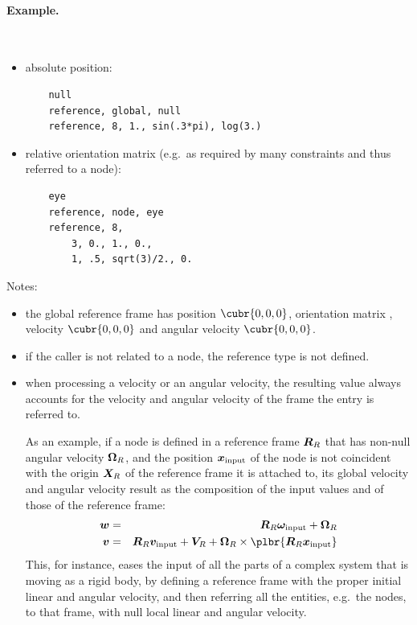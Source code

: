 \paragraph{Example.} \
\begin{itemize}
    \item absolute position:
    \begin{verbatim}
    null
    reference, global, null
    reference, 8, 1., sin(.3*pi), log(3.)
    \end{verbatim}
    \item relative orientation matrix (e.g.\ as required by many constraints and
    thus referred to a node):
    \begin{verbatim}
    eye
    reference, node, eye
    reference, 8,
        3, 0., 1., 0., 
        1, .5, sqrt(3)/2., 0.
    \end{verbatim}
\end{itemize}
Notes: 
\begin{itemize}
    \item the global reference frame has position $ \cubr{0, 0, 0} $,
    orientation matrix \kw{eye}, velocity $ \cubr{0, 0, 0} $ and angular
    velocity $ \cubr{0, 0, 0} $.
    \item if the caller is not related to a node, the reference type
    \kw{node} is not defined. 
    \item when processing a velocity or an angular velocity, the resulting
    value always accounts for the velocity and angular velocity of the frame
    the entry is referred to. 

    As an example, if a node is defined in a reference frame $\boldsymbol{R}_R$
    that has non-null angular velocity $ \boldsymbol{\Omega}_R $, and the position 
    $ \boldsymbol{x}_{\text{input}} $ of the node is not coincident
    with the origin $ \boldsymbol{X}_R $ of the reference frame
    it is attached to, its global velocity and angular velocity result
    as the composition of the input values and of those of the reference 
    frame:
    \begin{eqnarray*}    
        \T{w} & = & \T{R}_R \T{\omega}_{\text{input}} + \T{\Omega}_R \\
	\T{v} & = & \T{R}_R \T{v}_{\text{input}} + \T{V}_R
		+\T{\Omega}_R\times\plbr{\T{R}_R \T{x}_{\text{input}}}
    \end{eqnarray*}
    This, for instance, eases the input of all the parts of a complex system
    that is moving as a rigid body, by defining a reference frame with the
    proper initial linear and angular velocity, and then referring all the entities, e.g.\ the 
    nodes, to that frame, with null local linear and angular velocity.
\end{itemize}  
